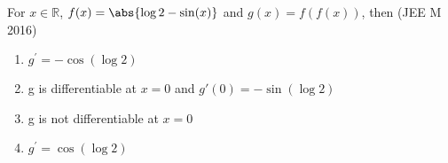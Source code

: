 

\iffalse
\title{11B(36-37)}
\author{EE24BTECH11055 - Sai Akhila Reddy Turpu}
\section{mcq-single}
\fi
		


	\item For $x\in\mathbb{R}$, $f(x)=\abs{\log 2-\sin(x)}$ and 
	$g(x)=f(f(x))$, then 
	\hfill{(JEE M 2016)}
	\begin{enumerate}
		\item $g^{\prime} = -\cos(\log 2)$
		\item g is differentiable at $x=0$ and $g'(0) = -\sin(\log 2)$
		\item g is not differentiable at $x=0$
		\item $g^{\prime} =  \cos(\log 2)$
	\end{enumerate}

